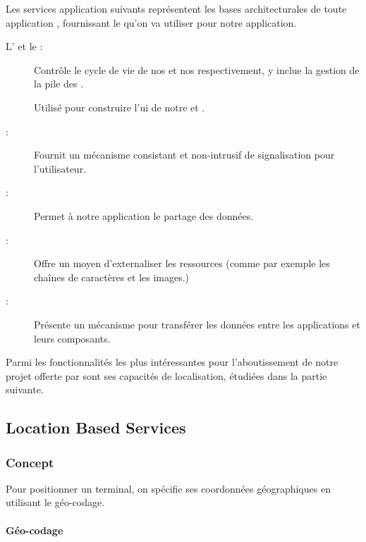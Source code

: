 Les services application suivants représentent les bases architecturales de toute application \android{}, fournissant le  qu'on va utiliser pour notre application.

\begin{description}

\item [L' et le :]
Contrôle le cycle de vie de nos  et nos  respectivement, y inclue la gestion de la pile des .

\item[]
Utilisé pour construire l'\gls{ui} de notre  et .

\item[:]
Fournit un mécanisme consistant et non-intrusif de signalisation pour l'utilisateur.

\item[:]
Permet à notre application le partage des données.

\item[:]
Offre un moyen d'externaliser les ressources (comme par exemple les chaînes de caractères et les images.)

\item[:]
Présente un mécanisme pour transférer les données entre les applications et leurs composants.

\end{description}

Parmi les fonctionnalités les plus intéressantes pour l'aboutissement de notre projet offerte par \android{} sont ses capacités de localisation, étudiées dans la partie suivante.

\subsection{Location Based Services}

\subsubsection{Concept}

Pour positionner un terminal, on spécifie ses coordonnées géographiques
en utilisant le géo-codage.

\paragraph[Géo-codage]{Géo-codage\cite{wiki:geocoding}}

